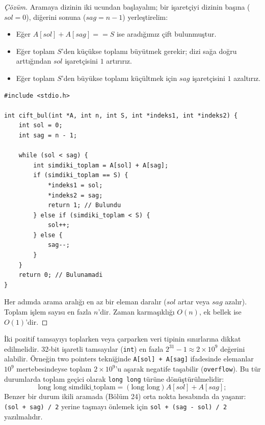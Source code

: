 \begin{proof}[Çözüm]
Aramaya dizinin iki ucundan başlayalım; bir işaretçiyi dizinin başına ($sol = 0$), diğerini sonuna ($sag = n - 1$) yerleştirelim:
\begin{itemize}
    \item Eğer $A[sol] + A[sag] == S$ ise aradığımız çift bulunmuştur.
    \item Eğer toplam $S$'den küçükse toplamı büyütmek gerekir; dizi sağa doğru arttığından $sol$ işaretçisini $1$ artırırız.
    \item Eğer toplam $S$'den büyükse toplamı küçültmek için $sag$ işaretçisini $1$ azaltırız.
\end{itemize}

\begin{lstlisting}[language=CTemel]
#include <stdio.h>

int cift_bul(int *A, int n, int S, int *indeks1, int *indeks2) {
    int sol = 0;
    int sag = n - 1;
    
    while (sol < sag) {
        int simdiki_toplam = A[sol] + A[sag];
        if (simdiki_toplam == S) {
            *indeks1 = sol;
            *indeks2 = sag;
            return 1; // Bulundu
        } else if (simdiki_toplam < S) {
            sol++;
        } else {
            sag--;
        }
    }
    return 0; // Bulunamadi
}
\end{lstlisting}

Her adımda arama aralığı en az bir eleman daralır ($sol$ artar veya $sag$ azalır). Toplam işlem sayısı en fazla $n$'dir. Zaman karmaşıklığı $O(n)$, ek bellek ise $O(1)$'dir.
\end{proof}

\begin{definition}
İki pozitif tamsayıyı toplarken veya çarparken veri tipinin sınırlarına dikkat edilmelidir. 32-bit işaretli tamsayılar (\texttt{int}) en fazla $2^{31}-1 \approx 2 \times 10^9$ değerini alabilir. Örneğin two pointers tekniğinde \texttt{A[sol] + A[sag]} ifadesinde elemanlar $10^9$ mertebesindeyse toplam $2 \times 10^9$'u aşarak negatife taşabilir (\texttt{overflow}). Bu tür durumlarda toplam geçici olarak \texttt{long long} türüne dönüştürülmelidir:
\[
\text{long long simdiki\_toplam} = (\text{long long})A[sol] + A[sag];
\]
Benzer bir durum ikili aramada (Bölüm 24) orta nokta hesabında da yaşanır: \texttt{(sol + sag) / 2} yerine taşmayı önlemek için \texttt{sol + (sag - sol) / 2} yazılmalıdır.
\end{definition}

